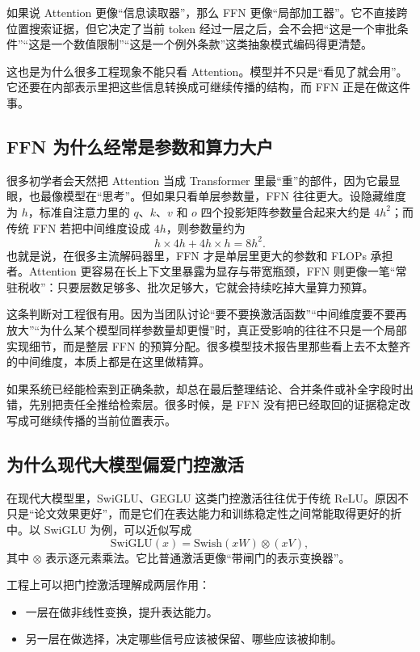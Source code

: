 如果说 Attention 更像“信息读取器”，那么 FFN 更像“局部加工器”。它不直接跨位置搜索证据，但它决定了当前 token 经过一层之后，会不会把“这是一个审批条件”“这是一个数值限制”“这是一个例外条款”这类抽象模式编码得更清楚。

这也是为什么很多工程现象不能只看 Attention。模型并不只是“看见了就会用”。它还要在内部表示里把这些信息转换成可继续传播的结构，而 FFN 正是在做这件事。

\subsection{FFN 为什么经常是参数和算力大户}
很多初学者会天然把 Attention 当成 Transformer 里最“重”的部件，因为它最显眼，也最像模型在“思考”。但如果只看单层参数量，FFN 往往更大。设隐藏维度为 \(h\)，标准自注意力里的 \(q\)、\(k\)、\(v\) 和 \(o\) 四个投影矩阵参数量合起来大约是 \(4h^2\)；而传统 FFN 若把中间维度设成 \(4h\)，则参数量约为
\[
h\times 4h+4h\times h=8h^2.
\]
也就是说，在很多主流解码器里，FFN 才是单层里更大的参数和 FLOPs 承担者。Attention 更容易在长上下文里暴露为显存与带宽瓶颈，FFN 则更像一笔“常驻税收”：只要层数足够多、批次足够大，它就会持续吃掉大量算力预算。

这条判断对工程很有用。因为当团队讨论“要不要换激活函数”“中间维度要不要再放大”“为什么某个模型同样参数量却更慢”时，真正受影响的往往不只是一个局部实现细节，而是整层 FFN 的预算分配。很多模型技术报告里那些看上去不太整齐的中间维度，本质上都是在这里做精算。

\begin{note}
如果系统已经能检索到正确条款，却总在最后整理结论、合并条件或补全字段时出错，先别把责任全推给检索层。很多时候，是 FFN 没有把已经取回的证据稳定改写成可继续传播的当前位置表示。
\end{note}

\subsection{为什么现代大模型偏爱门控激活}
在现代大模型里，SwiGLU、GEGLU 这类门控激活往往优于传统 ReLU。原因不只是“论文效果更好”，而是它们在表达能力和训练稳定性之间常能取得更好的折中。以 SwiGLU 为例，可以近似写成
\[
\mathrm{SwiGLU}(x)=\mathrm{Swish}(xW)\otimes(xV),
\]
其中 \(\otimes\) 表示逐元素乘法。它比普通激活更像“带闸门的表示变换器”。

工程上可以把门控激活理解成两层作用：
\begin{itemize}
  \item 一层在做非线性变换，提升表达能力。
  \item 另一层在做选择，决定哪些信号应该被保留、哪些应该被抑制。
\end{itemize}

